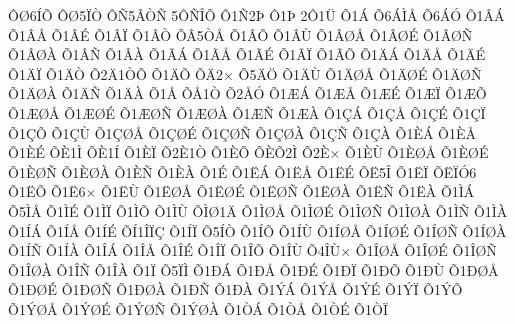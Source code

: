 {^^d4^^d86^^cd^^d5
^^d4^^d85^^cf^^d2
^^d4^^d15^^c2^^d2^^d1
5^^d4^^d1^^ce^^d5
^^d41^^d12^^de
^^d41^^de
2^^d41^^dc
^^d51^^c1
^^d56^^c1^^cc^^c5
^^d56^^c1^^d3
^^d51^^c2^^c1
^^d51^^c2^^c5
^^d51^^c2^^c9
^^d51^^c2^^cf
^^d51^^c2^^d2
^^d5^^c25^^d2^^c5
^^d51^^c2^^d5
^^d51^^c2^^d9
^^d51^^c2^^d8^^c5
^^d51^^c2^^d8^^c9
^^d51^^c2^^d8^^d1
^^d51^^c2^^d8^^c0
^^d51^^c2^^d1
^^d51^^c2^^c0
^^d51^^c3^^c1
^^d51^^c3^^c5
^^d51^^c3^^c9
^^d51^^c3^^cf
^^d51^^c3^^d5
^^d51^^c4^^c1
^^d51^^c4^^c5
^^d51^^c4^^c9
^^d51^^c4^^cf
^^d51^^c4^^d2
^^d52^^c41^^d2^^d5
^^d51^^c4^^d5
^^d5^^c42^^d7
^^d55^^c4^^d6
^^d51^^c4^^d9
^^d51^^c4^^d8^^c5
^^d51^^c4^^d8^^c9
^^d51^^c4^^d8^^d1
^^d51^^c4^^d8^^c0
^^d51^^c4^^d1
^^d51^^c4^^c0
^^d51^^c5
^^d5^^c51^^d2
^^d52^^c5^^d3
^^d51^^c6^^c1
^^d51^^c6^^c5
^^d51^^c6^^c9
^^d51^^c6^^cf
^^d51^^c6^^d5
^^d51^^c6^^d8^^c5
^^d51^^c6^^d8^^c9
^^d51^^c6^^d8^^d1
^^d51^^c6^^d8^^c0
^^d51^^c6^^d1
^^d51^^c6^^c0
^^d51^^c7^^c1
^^d51^^c7^^c5
^^d51^^c7^^c9
^^d51^^c7^^cf
^^d51^^c7^^d5
^^d51^^c7^^d9
^^d51^^c7^^d8^^c5
^^d51^^c7^^d8^^c9
^^d51^^c7^^d8^^d1
^^d51^^c7^^d8^^c0
^^d51^^c7^^d1
^^d51^^c7^^c0
^^d51^^c8^^c1
^^d51^^c8^^c5
^^d51^^c8^^c9
^^d5^^c81^^cc
^^d5^^c81^^cd
^^d51^^c8^^cf
^^d52^^c81^^d2
^^d51^^c8^^d5
^^d5^^c8^^d52^^cc
^^d52^^c8^^d7
^^d51^^c8^^d9
^^d51^^c8^^d8^^c5
^^d51^^c8^^d8^^c9
^^d51^^c8^^d8^^d1
^^d51^^c8^^d8^^c0
^^d51^^c8^^d1
^^d51^^c8^^c0
^^d51^^c9
^^d51^^cb^^c1
^^d51^^cb^^c5
^^d51^^cb^^c9
^^d5^^cb5^^ce
^^d51^^cb^^cf
^^d5^^cb^^cf^^d36
^^d51^^cb^^d5
^^d51^^cb6^^d7
^^d51^^cb^^d9
^^d51^^cb^^d8^^c5
^^d51^^cb^^d8^^c9
^^d51^^cb^^d8^^d1
^^d51^^cb^^d8^^c0
^^d51^^cb^^d1
^^d51^^cb^^c0
^^d51^^cc^^c1
^^d55^^cc^^c5
^^d51^^cc^^c9
^^d51^^cc^^cf
^^d51^^cc^^d5
^^d51^^cc^^d9
^^d5^^cc^^d81^^c4
^^d51^^cc^^d8^^c5
^^d51^^cc^^d8^^c9
^^d51^^cc^^d8^^d1
^^d51^^cc^^d8^^c0
^^d51^^cc^^d1
^^d51^^cc^^c0
^^d51^^cd^^c1
^^d51^^cd^^c5
^^d51^^cd^^c9
^^d5^^cd1^^ce^^cf^^c7
^^d51^^cd^^cf
^^d55^^cd^^d2
^^d51^^cd^^d5
^^d51^^cd^^d9
^^d51^^cd^^d8^^c5
^^d51^^cd^^d8^^c9
^^d51^^cd^^d8^^d1
^^d51^^cd^^d8^^c0
^^d51^^cd^^d1
^^d51^^cd^^c0
^^d51^^ce^^c1
^^d51^^ce^^c5
^^d51^^ce^^c9
^^d51^^ce^^cf
^^d51^^ce^^d5
^^d51^^ce^^d9
^^d54^^ce^^d9^^d7
^^d51^^ce^^d8^^c5
^^d51^^ce^^d8^^c9
^^d51^^ce^^d8^^d1
^^d51^^ce^^d8^^c0
^^d51^^ce^^d1
^^d51^^ce^^c0
^^d51^^cf
^^d55^^cf^^cc
^^d51^^d0^^c1
^^d51^^d0^^c5
^^d51^^d0^^c9
^^d51^^d0^^cf
^^d51^^d0^^d5
^^d51^^d0^^d9
^^d51^^d0^^d8^^c5
^^d51^^d0^^d8^^c9
^^d51^^d0^^d8^^d1
^^d51^^d0^^d8^^c0
^^d51^^d0^^d1
^^d51^^d0^^c0
^^d51^^dd^^c1
^^d51^^dd^^c5
^^d51^^dd^^c9
^^d51^^dd^^cf
^^d51^^dd^^d5
^^d51^^dd^^d8^^c5
^^d51^^dd^^d8^^c9
^^d51^^dd^^d8^^d1
^^d51^^dd^^d8^^c0
^^d51^^d2^^c1
^^d51^^d2^^c5
^^d51^^d2^^c9
^^d51^^d2^^cf
}
